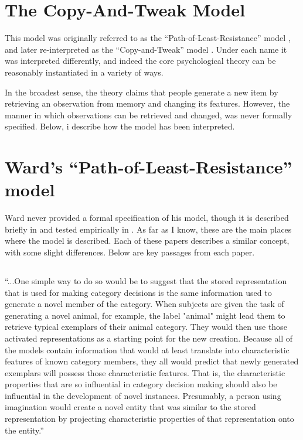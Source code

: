 \documentclass[12pt]{article}
\begin{document}
\section{The Copy-And-Tweak Model}

This model was originally referred to as the ``Path-of-Least-Resistance'' model \citep{ward1994structured,ward1995s,ward2002role}, and later re-interpreted as the ``Copy-and-Tweak'' model \citep{jern2013probabilistic}. Under each name it was interpreted differently, and indeed the core psychological theory can be reasonably instantiated in a variety of ways.

In the broadest sense, the theory claims that people generate a new item by retrieving an observation from memory and changing its features. However, the manner in which observations can be retrieved and changed, was never formally specified. Below, i describe how the model has been interpreted.

\section{Ward's ``Path-of-Least-Resistance'' model}

Ward never provided a formal specification of his model, though it is described briefly in \cite{ward1994structured,ward1995s} and tested empirically in \cite{ward2002role}. As far as I know, these are the main places where the model is described. Each of these papers describes a similar concept, with some slight differences. Below are key passages from each paper.

\subsection{\cite{ward1994structured}}
\begin{displayquote}
``...One simple way to do so would be to suggest that the stored representation that is used for making category decisions is the same information used to generate a novel member of the category. When subjects are given the task of generating a novel animal, for example, the label "animal" might lead them to retrieve typical exemplars of their animal category. They would then use those activated representations as a starting point for the new creation. Because all of the models contain information that would at least translate into characteristic features of known category members, they all would predict that newly generated exemplars will possess those characteristic features. That is, the characteristic properties that are so influential in category decision making should also be influential in the development of novel instances. Presumably, a person using imagination would create a novel entity that was similar to the stored representation by projecting characteristic properties of that representation onto the entity.''
\end{displayquote}
\end{document}
